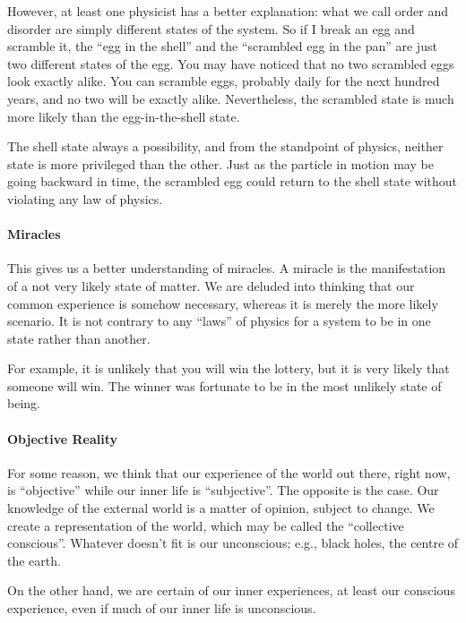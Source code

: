 However, at least one physicist has a better explanation: what we call order and disorder are simply different states of
the system. So if I break an egg and scramble it, the “egg in the shell” and the “scrambled egg in the pan” are just
two different states of the egg. You may have noticed that no two scrambled eggs look exactly alike. You can scramble
eggs, probably daily for the next hundred years, and no two will be exactly alike. Nevertheless, the scrambled state is
much more likely than the egg-in-the-shell state.

The shell state always a possibility, and from the standpoint of physics, neither state is more privileged than the
other. Just as the particle in motion may be going backward in time, the scrambled egg could return to the shell state
without violating any law of physics.

\paragraph{Miracles}
This gives us a better understanding of miracles. A miracle is the manifestation of a not very likely state of matter.
We are deluded into thinking that our common experience is somehow necessary, whereas it is merely the more likely
scenario. It is not contrary to any “laws” of physics for a system to be in one state rather than another.

For example, it is unlikely that you will win the lottery, but it is very likely that someone will win. The winner was
fortunate to be in the most unlikely state of being.

\paragraph{Objective Reality}
For some reason, we think that our experience of the world out there, right now, is “objective” while our inner life is
“subjective”. The opposite is the case. Our knowledge of the external world is a matter of opinion, subject to change.
We create a representation of the world, which may be called the “collective conscious”. Whatever doesn't
fit is our unconscious; e.g., black holes, the centre of the earth.

On the other hand, we are certain of our inner experiences, at least our conscious experience, even if much of our inner
life is unconscious.

